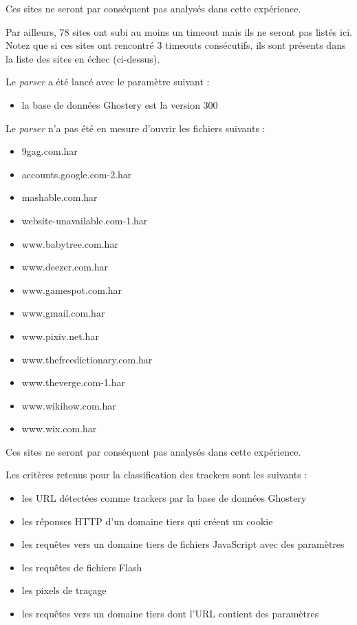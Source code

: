 Ces sites ne seront par conséquent pas analysés dans cette expérience.
\newline

Par ailleurs, 78 sites ont subi au moins un timeout mais ils ne seront pas listés ici. Notez que si ces sites ont rencontré 3 timeouts consécutifs, ils sont présents dans la liste des sites en échec (ci-dessus).
\newline

Le \textit{parser} a été lancé avec le paramètre suivant :
\begin{itemize}
	\item la base de données Ghostery est la version 300
	\newline
\end{itemize}

Le \textit{parser} n'a pas été en mesure d'ouvrir les fichiers suivants :
\begin{multicols}{2}
\begin{itemize}
  \item 9gag.com.har
  \item accounts.google.com-2.har
  \item mashable.com.har
  \item website-unavailable.com-1.har
  \item www.babytree.com.har
  \item www.deezer.com.har
  \item www.gamespot.com.har
  \item www.gmail.com.har
  \item www.pixiv.net.har
  \item www.thefreedictionary.com.har
  \item www.theverge.com-1.har
  \item www.wikihow.com.har
  \item www.wix.com.har
\end{itemize}
\end{multicols}

Ces sites ne seront par conséquent pas analysés dans cette expérience.
\newline

Les critères retenus pour la classification des trackers sont les suivants :
\begin{itemize}
	\item les URL détectées comme trackers par la base de données Ghostery
	\item les réponses HTTP d'un domaine tiers qui créent un cookie
	\item les requêtes vers un domaine tiers de fichiers JavaScript avec des paramètres
	\item les requêtes de fichiers Flash
	\item les pixels de traçage
	\item les requêtes vers un domaine tiers dont l'URL contient des paramètres
	\newline
\end{itemize}

